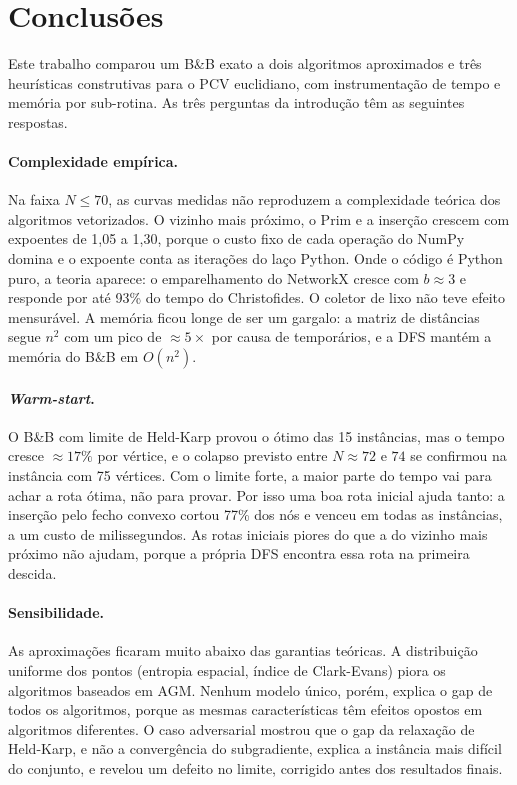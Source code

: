 \section{Conclusões}\label{sec:conclusions}

Este trabalho comparou um B\&B exato a dois algoritmos aproximados e três heurísticas
construtivas para o PCV euclidiano, com instrumentação de tempo e memória por sub-rotina.
As três perguntas da introdução têm as seguintes respostas.

\paragraph{Complexidade empírica.} Na faixa $N \leq 70$, as curvas medidas não reproduzem
a complexidade teórica dos algoritmos vetorizados. O vizinho mais próximo, o Prim e a
inserção crescem com expoentes de 1,05 a 1,30, porque o custo fixo de cada operação do
NumPy domina e o expoente conta as iterações do laço Python. Onde o código é Python puro,
a teoria aparece: o emparelhamento do NetworkX cresce com $b \approx 3$ e responde por
até 93\% do tempo do Christofides. O coletor de lixo não teve efeito mensurável. A
memória ficou longe de ser um gargalo: a matriz de distâncias segue $n^2$ com um pico de
$\approx 5\times$ por causa de temporários, e a DFS mantém a memória do B\&B em $O(n^2)$.

\paragraph{\emph{Warm-start}.} O B\&B com limite de Held-Karp provou o ótimo das 15
instâncias, mas o tempo cresce $\approx 17\%$ por vértice, e o colapso previsto entre
$N \approx 72$ e $74$ se confirmou na instância com 75 vértices. Com o limite forte, a maior parte do tempo vai para achar a
rota ótima, não para provar. Por isso uma boa rota inicial ajuda tanto: a inserção pelo
fecho convexo cortou 77\% dos nós e venceu em todas as instâncias, a um custo de
milissegundos. As rotas iniciais piores do que a do vizinho mais próximo não ajudam,
porque a própria DFS encontra essa rota na primeira descida.

\paragraph{Sensibilidade.} As aproximações ficaram muito abaixo das garantias teóricas.
A distribuição uniforme dos pontos (entropia espacial, índice de Clark-Evans) piora os
algoritmos baseados em AGM. Nenhum modelo único, porém, explica o gap de todos os
algoritmos, porque as mesmas características têm efeitos opostos em algoritmos
diferentes. O caso adversarial mostrou que o gap da relaxação de Held-Karp, e não a
convergência do subgradiente, explica a instância mais difícil do conjunto, e revelou um
defeito no limite, corrigido antes dos resultados finais.

